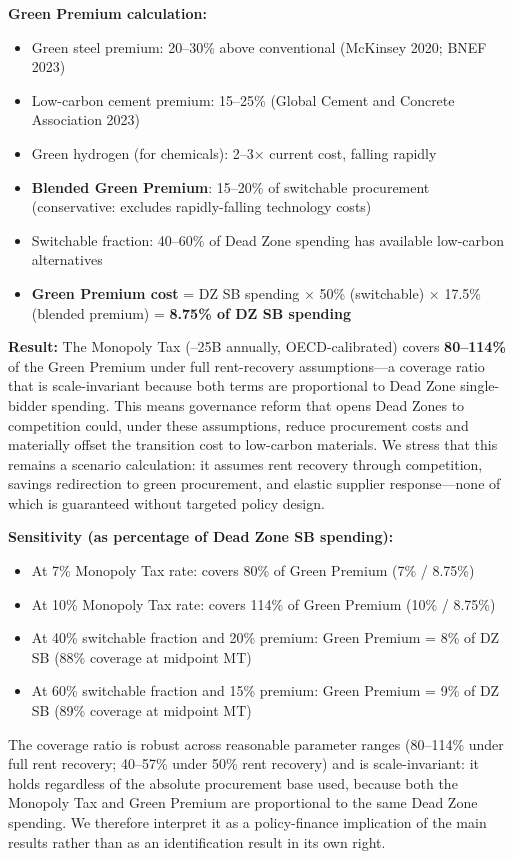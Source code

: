 \documentclass[11pt]{article}
\begin{document}
\textbf{Green Premium calculation:}
\begin{itemize}
    \item Green steel premium: 20--30\% above conventional (McKinsey 2020; BNEF 2023)
    \item Low-carbon cement premium: 15--25\% (Global Cement and Concrete Association 2023)
    \item Green hydrogen (for chemicals): 2--3$\times$ current cost, falling rapidly
    \item \textbf{Blended Green Premium}: 15--20\% of switchable procurement (conservative: excludes rapidly-falling technology costs)
    \item Switchable fraction: 40--60\% of Dead Zone spending has available low-carbon alternatives
    \item \textbf{Green Premium cost} = DZ SB spending $\times$ 50\% (switchable) $\times$ 17.5\% (blended premium) = \textbf{8.75\% of DZ SB spending}
\end{itemize}

\textbf{Result:} The Monopoly Tax (--25B annually, OECD-calibrated) covers \textbf{80--114\%} of the Green Premium under full rent-recovery assumptions---a coverage ratio that is scale-invariant because both terms are proportional to Dead Zone single-bidder spending. This means governance reform that opens Dead Zones to competition could, under these assumptions, reduce procurement costs and materially offset the transition cost to low-carbon materials. We stress that this remains a scenario calculation: it assumes rent recovery through competition, savings redirection to green procurement, and elastic supplier response---none of which is guaranteed without targeted policy design.

\textbf{Sensitivity (as percentage of Dead Zone SB spending):}
\begin{itemize}
    \item At 7\% Monopoly Tax rate: covers 80\% of Green Premium (7\% / 8.75\%)
    \item At 10\% Monopoly Tax rate: covers 114\% of Green Premium (10\% / 8.75\%)
    \item At 40\% switchable fraction and 20\% premium: Green Premium = 8\% of DZ SB (88\% coverage at midpoint MT)
    \item At 60\% switchable fraction and 15\% premium: Green Premium = 9\% of DZ SB (89\% coverage at midpoint MT)
\end{itemize}

The coverage ratio is robust across reasonable parameter ranges (80--114\% under full rent recovery; 40--57\% under 50\% rent recovery) and is scale-invariant: it holds regardless of the absolute procurement base used, because both the Monopoly Tax and Green Premium are proportional to the same Dead Zone spending. We therefore interpret it as a policy-finance implication of the main results rather than as an identification result in its own right.
\end{document}

